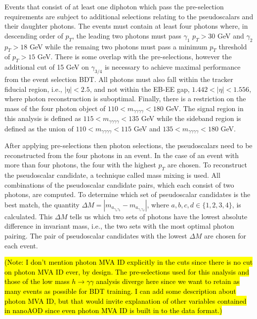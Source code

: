 \documentclass[12pt]{article}
\begin{document}
Events that consist of at least one diphoton which pass the pre-selection requirements are subject to additional selections relating to the pseudoscalars and their daughter photons. The events must contain at least four photons where, in descending order of $p_T$, the leading two photons must pass $\gamma_1$ $p_T > 30$ GeV and $\gamma_2$ $p_T > 18$ GeV while the remaing two photons must pass a minimum $p_T$ threshold of $p_{T} > 15$ GeV. There is some overlap with the pre-selections, however the additional cut of 15 GeV on $\gamma_{3/4}$ is necessary to achieve maximal performance from the event selection BDT. All photons must also fall within the tracker fiducial region, i.e., $|\eta| < 2.5$, and not within the EB-EE gap, $1.442 < |\eta| < 1.556$, where photon reconstruction is suboptimal. Finally, there is a restriction on the mass of the four photon object of $110 < m_{\gamma \gamma \gamma \gamma} < 180$ GeV. The signal region in this analysis is defined as $115 < m_{\gamma \gamma \gamma \gamma} < 135$ GeV while the sideband region is defined as the union of $110 < m_{\gamma \gamma \gamma \gamma} < 115$ GeV and $135 < m_{\gamma \gamma \gamma \gamma} < 180$ GeV.

After applying pre-selections then photon selections, the pseudoscalars need to be reconstructed from the four photons in an event. In the case of an event with more than four photons, the four with the highest $p_T$ are chosen. To reconstruct the pseudoscalar candidate, a technique called mass mixing is used. All combinations of the pseudoscalar candidate pairs, which each consist of two photons, are computed. To determine which set of pseudoscalar candidates is the best match, the quantity $\Delta M = |m_{a_{\gamma_{a} \gamma_{b}}} - m_{a_{\gamma_{c} \gamma_{d}}}|$, where $a,b,c,d \in \{1,2,3,4\}$, is calculated. This $\Delta M$ tells us which two sets of photons have the lowest absolute difference in invariant mass, i.e., the two sets with the most optimal photon pairing. The pair of pseudoscalar candidates with the lowest $\Delta M$ are chosen for each event.\par

\hl{(Note: I don't mention photon MVA ID explicitly in the cuts since there is no cut on photon MVA ID ever, by design. The pre-selections used for this analysis and those of the low mass $h\rightarrow \gamma\gamma$ analysis diverge here since we want to retain as many events as possible for BDT training. I can add some description about photon MVA ID, but that would invite explanation of other variables contained in nanoAOD since even photon MVA ID is built in to the data format.)}
\end{document}
